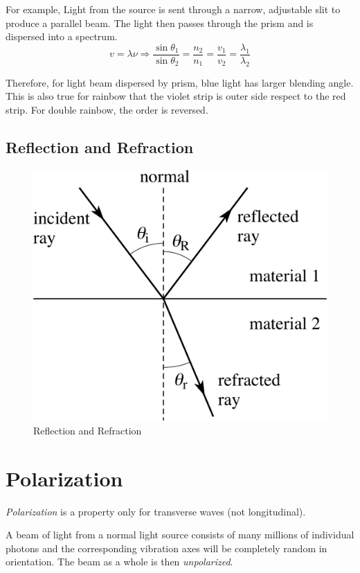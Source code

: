 \documentclass[UTF8]{book}
\begin{document}
For example, Light from the source is sent through a narrow, adjustable slit to produce a parallel beam. The light then passes through the prism and is dispersed into a spectrum. 
\[v=\lambda \nu \Rightarrow \frac{\sin \theta _1}{\sin \theta _2}=\frac{n_2}{n_1}=\frac{v _1}{v _2}=\frac{\lambda _1}{\lambda _2}\]

Therefore, for light beam dispersed by prism, blue light has larger blending angle. This is also true for rainbow that the violet strip is outer side respect to the red strip. For double rainbow, the order is reversed.

\subsection{Reflection and Refraction}
\begin{figure}[H]
\centering
\label{fig:13}
\includegraphics[scale=1]{Figure/13.PNG}
\caption{Reflection and Refraction}
\end{figure}
\section{Polarization}
\emph{Polarization} is a property only for transverse waves (not longitudinal).

A beam of light from a normal light source consists of many millions of individual photons and the corresponding vibration axes will be completely random in orientation. The beam as a whole is then \emph{unpolarized}.
\end{document}
